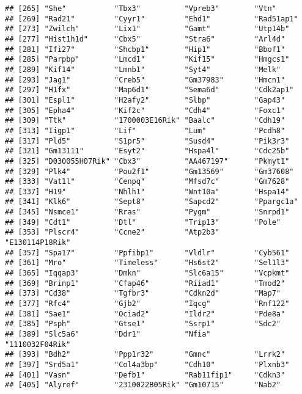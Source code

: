 \documentclass[
]{article}
\begin{document}
\begin{verbatim}
## [265] "She"           "Tbx3"          "Vpreb3"        "Vtn"          
## [269] "Rad21"         "Cyyr1"         "Ehd1"          "Rad51ap1"     
## [273] "Zwilch"        "Lix1"          "Gamt"          "Utp14b"       
## [277] "Hist1h1d"      "Cbx5"          "Stra6"         "Arl4d"        
## [281] "Ifi27"         "Shcbp1"        "Hip1"          "Bbof1"        
## [285] "Parpbp"        "Lmcd1"         "Kif15"         "Hmgcs1"       
## [289] "Kif14"         "Lmnb1"         "Syt4"          "Melk"         
## [293] "Jag1"          "Creb5"         "Gm37983"       "Hmcn1"        
## [297] "H1fx"          "Map6d1"        "Sema6d"        "Cdk2ap1"      
## [301] "Espl1"         "H2afy2"        "Slbp"          "Gap43"        
## [305] "Epha4"         "Kif2c"         "Cdh4"          "Foxc1"        
## [309] "Ttk"           "1700003E16Rik" "Baalc"         "Cdh19"        
## [313] "Iigp1"         "Lif"           "Lum"           "Pcdh8"        
## [317] "Pld5"          "S1pr5"         "Susd4"         "Pik3r3"       
## [321] "Gm13111"       "Esyt2"         "Hspa4l"        "Cdc25b"       
## [325] "D030055H07Rik" "Cbx3"          "AA467197"      "Pkmyt1"       
## [329] "Plk4"          "Pou2f1"        "Gm13569"       "Gm37608"      
## [333] "Vat1l"         "Cenpq"         "Mfsd7c"        "Gm7628"       
## [337] "H19"           "Nhlh1"         "Wnt10a"        "Hspa14"       
## [341] "Klk6"          "Sept8"         "Sapcd2"        "Ppargc1a"     
## [345] "Nsmce1"        "Rras"          "Pygm"          "Snrpd1"       
## [349] "Cdt1"          "Dtl"           "Trip13"        "Pole"         
## [353] "Plscr4"        "Ccne2"         "Atp2b3"        "E130114P18Rik"
## [357] "Spa17"         "Ppfibp1"       "Vldlr"         "Cyb561"       
## [361] "Mro"           "Timeless"      "Hs6st2"        "Sel1l3"       
## [365] "Iqgap3"        "Dmkn"          "Slc6a15"       "Vcpkmt"       
## [369] "Brinp1"        "Cfap46"        "Riiad1"        "Tmod2"        
## [373] "Cd38"          "Tgfbr3"        "Cdkn2d"        "Map7"         
## [377] "Rfc4"          "Gjb2"          "Iqcg"          "Rnf122"       
## [381] "Sae1"          "Ociad2"        "Ildr2"         "Pde8a"        
## [385] "Psph"          "Gtse1"         "Ssrp1"         "Sdc2"         
## [389] "Slc5a6"        "Ddr1"          "Nfia"          "1110032F04Rik"
## [393] "Bdh2"          "Ppp1r32"       "Gmnc"          "Lrrk2"        
## [397] "Srd5a1"        "Col4a3bp"      "Cdh10"         "Plxnb3"       
## [401] "Vasn"          "Defb1"         "Rab11fip1"     "Cdkn3"        
## [405] "Alyref"        "2310022B05Rik" "Gm10715"       "Nab2"         

\end{verbatim}
\end{document}
